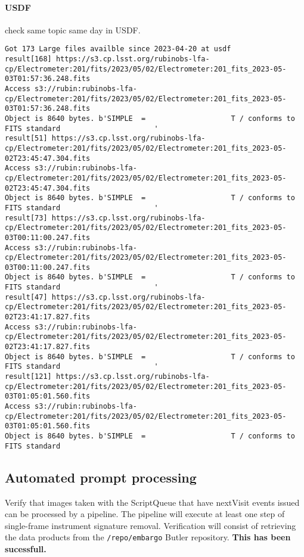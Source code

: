 \paragraph{USDF} check same topic same day in USDF.
\begin{lstlisting}
Got 173 Large files availble since 2023-04-20 at usdf
result[168] https://s3.cp.lsst.org/rubinobs-lfa-cp/Electrometer:201/fits/2023/05/02/Electrometer:201_fits_2023-05-03T01:57:36.248.fits
Access s3://rubin:rubinobs-lfa-cp/Electrometer:201/fits/2023/05/02/Electrometer:201_fits_2023-05-03T01:57:36.248.fits
Object is 8640 bytes. b'SIMPLE  =                    T / conforms to FITS standard                      '
result[51] https://s3.cp.lsst.org/rubinobs-lfa-cp/Electrometer:201/fits/2023/05/02/Electrometer:201_fits_2023-05-02T23:45:47.304.fits
Access s3://rubin:rubinobs-lfa-cp/Electrometer:201/fits/2023/05/02/Electrometer:201_fits_2023-05-02T23:45:47.304.fits
Object is 8640 bytes. b'SIMPLE  =                    T / conforms to FITS standard                      '
result[73] https://s3.cp.lsst.org/rubinobs-lfa-cp/Electrometer:201/fits/2023/05/02/Electrometer:201_fits_2023-05-03T00:11:00.247.fits
Access s3://rubin:rubinobs-lfa-cp/Electrometer:201/fits/2023/05/02/Electrometer:201_fits_2023-05-03T00:11:00.247.fits
Object is 8640 bytes. b'SIMPLE  =                    T / conforms to FITS standard                      '
result[47] https://s3.cp.lsst.org/rubinobs-lfa-cp/Electrometer:201/fits/2023/05/02/Electrometer:201_fits_2023-05-02T23:41:17.827.fits
Access s3://rubin:rubinobs-lfa-cp/Electrometer:201/fits/2023/05/02/Electrometer:201_fits_2023-05-02T23:41:17.827.fits
Object is 8640 bytes. b'SIMPLE  =                    T / conforms to FITS standard                      '
result[121] https://s3.cp.lsst.org/rubinobs-lfa-cp/Electrometer:201/fits/2023/05/02/Electrometer:201_fits_2023-05-03T01:05:01.560.fits
Access s3://rubin:rubinobs-lfa-cp/Electrometer:201/fits/2023/05/02/Electrometer:201_fits_2023-05-03T01:05:01.560.fits
Object is 8640 bytes. b'SIMPLE  =                    T / conforms to FITS standard
\end{lstlisting}

\subsection{Automated prompt processing}
Verify that images taken with the ScriptQueue that have nextVisit events issued can be processed by a pipeline.
The pipeline will execute at least one step of single-frame instrument signature removal.
Verification will consist of retrieving the data products from the \texttt{/repo/embargo} Butler repository.
\textbf{This has been sucessfull.}
